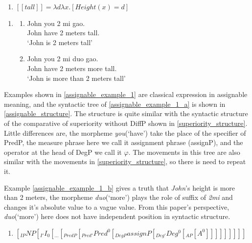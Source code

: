 \documentclass{ctexart}
\begin{document}
\begin{enumerate}
    \item \label{tallLE_re_re_b}
    $[\![tall]\!]=\lambda d \lambda x.[Height(x) = d]$
\end{enumerate}

\begin{enumerate}
    \item \label{assignable_example_1}
    \begin{enumerate}
        \item \label{assignable_example_1_a}
        John you 2 mi gao. \\
        John have 2 meters tall. \\
        `John is 2 meters tall'
        
        \item \label{assignable_example_1_b}
        John you 2 mi duo gao. \\
        John have 2 meters more tall. \\
        `John is more than 2 meters tall'
        
    \end{enumerate}
\end{enumerate}

Examples shown in \ref{assignable_example_1} are classical expression in assignable meaning, and the syntactic tree of \ref{assignable_example_1_a} is shown in \ref{assignable_structure}. The structure is quite similar with the syntactic structure of the comparative of superiority without DiffP shown in \ref{superiority_structure}. Little differences are, the morpheme \textit{you}(`have') take the place of the specifier of PredP, the measure phrase here we call it assignment phrase (assignP), and the operator at the head of DegP we call it $\varphi$. The movements in this tree are also similar with the movements in \ref{superiority_structure}, so there is need to repeat it.

Example \ref{assignable_example_1_b} gives a truth that \textit{John}'s height is more than 2 meters, the morpheme \textit{duo}(`more') plays the role of suffix of \textit{2mi} and changes it's absolute value to a vague value. From this paper's perspective, \textit{duo}(`more') here does not have independent position in syntactic structure.

\begin{enumerate}
    \item \label{assignable_structure}
    $[_{IP} NP [_{I'} I_0[_{...}[_{PredP}[_{Pred'}Pred^0[_{DegP}assignP[_{Deg'}Deg^0[_{AP}[A^0]]]]]]]]]$
\end{enumerate}
\end{document}
